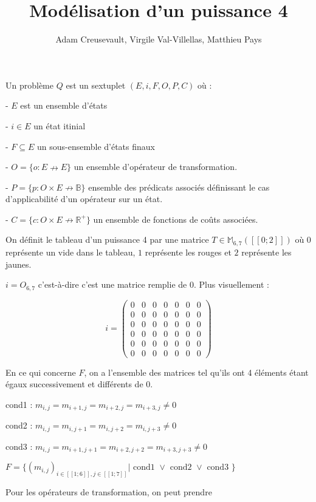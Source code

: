 \documentclass{article}
\title{\textbf{Modélisation d'un puissance 4}}
\author{Adam Creusevault, Virgile Val-Villellas, Matthieu Pays}
\begin{document}
\maketitle
\thispagestyle{empty}

Un problème $Q$ est un sextuplet $(E, i, F, O, P, C)$ où :

 - $E$ est un ensemble d'états

 - $i\in E$ un état itinial

 - $F \subseteq E$ un sous-ensemble d'états finaux

 - $O = \{ o : E \nrightarrow E \} $ un ensemble d'opérateur de transformation.

 - $P = \{ p : O \times E \nrightarrow \mathbb{B} \} $ ensemble des prédicats associés définissant le cas d'applicabilité d'un opérateur sur un état.

 - $C = \{ c : O \times E \nrightarrow \mathbb{R^+} \} $ un ensemble de fonctions de coûts associées.


On définit le tableau d'un puissance 4 par une matrice $T \in \mathbb{M}_{6, 7}([\![0;2]\!])$ où $0$ représente un vide dans le tableau, $1$ représente les rouges et $2$ représente les jaunes.

$i = O_{6, 7}$ c'est-à-dire c'est une matrice remplie de $0$. Plus visuellement : 


$$
i = 
\begin{pmatrix}
0 & 0 & 0 & 0 & 0 & 0 & 0 \\
0 & 0 & 0 & 0 & 0 & 0 & 0 \\
0 & 0 & 0 & 0 & 0 & 0 & 0 \\
0 & 0 & 0 & 0 & 0 & 0 & 0 \\
0 & 0 & 0 & 0 & 0 & 0 & 0 \\
0 & 0 & 0 & 0 & 0 & 0 & 0
\end{pmatrix}$$


En ce qui concerne $F$, on a l'ensemble des matrices tel qu'ils ont 4 éléments étant égaux successivement et différents de 0. 

cond1 : $m_{i,j} = m_{i+1,j} = m_{i+2,j} = m_{i+3,j} \neq 0$

cond2 : $m_{i,j} = m_{i,j+1} = m_{i,j+2} = m_{i,j+3} \neq 0$

cond3 : $m_{i,j} = m_{i+1,j+1} = m_{i+2,j+2} = m_{i+3,j+3} \neq 0$

$F = \{ (m_{i,j})_{i\in  [\![1;6]\!], j\in [\![1;7]\!]  } |  \text{ cond1 } \vee \text{ cond2 } \vee \text{ cond3 } \}$


Pour les opérateurs de transformation, on peut prendre 
\end{document}
